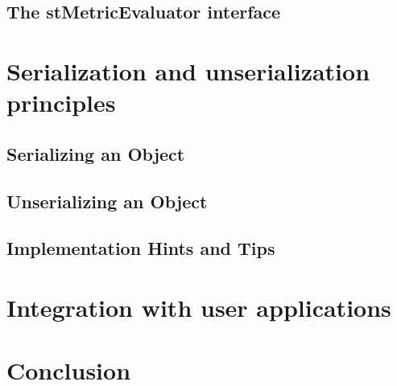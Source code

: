 \subsection{The stMetricEvaluator interface}

\section{Serialization and unserialization principles}

\subsection{Serializing an Object}

\subsection{Unserializing an Object}

\subsection{Implementation Hints and Tips}

\section{Integration with user applications}

\section{Conclusion}